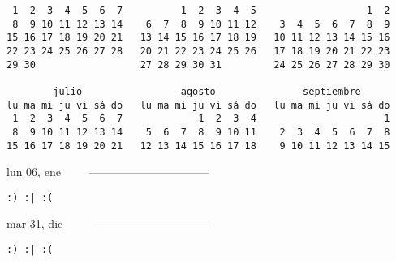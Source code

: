 \documentclass[letterpaper,10pt]{article}
\begin{document}
\begin{multicols}{3}
\begin{center}
\begin{tiny}
\begin{verbatim} 1  2  3  4  5  6  7          1  2  3  4  5                   1  2
 8  9 10 11 12 13 14    6  7  8  9 10 11 12    3  4  5  6  7  8  9
15 16 17 18 19 20 21   13 14 15 16 17 18 19   10 11 12 13 14 15 16
22 23 24 25 26 27 28   20 21 22 23 24 25 26   17 18 19 20 21 22 23
29 30                  27 28 29 30 31         24 25 26 27 28 29 30

        julio                 agosto               septiembre
lu ma mi ju vi sá do   lu ma mi ju vi sá do   lu ma mi ju vi sá do
 1  2  3  4  5  6  7             1  2  3  4                      1
 8  9 10 11 12 13 14    5  6  7  8  9 10 11    2  3  4  5  6  7  8
15 16 17 18 19 20 21   12 13 14 15 16 17 18    9 10 11 12 13 14 15\end{verbatim}
\end{tiny}
\end{center}
\vfill
{lun 06, ene\ \ \ \ \ --------------------------------}
\begin{flushright}\begin{small}\texttt{:) :| :(}\end{small}\end{flushright}\par
\vfill
{mar 31, dic\ \ \ \ \ --------------------------------}
\begin{flushright}\begin{small}\texttt{:) :| :(}\end{small}\end{flushright}\par
\vfill
\end{multicols}
\vspace{1.05cm}
\end{document}
